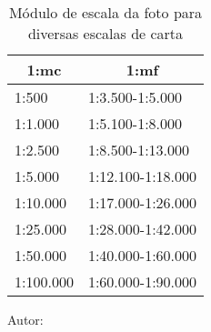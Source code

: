 	\begin{table}[H]
    \centering
		\begin{tabular}{l|l}
			\hline
			\multicolumn{1}{c|}{\textbf{1:mc}} & \multicolumn{1}{c}{\textbf{1:mf}} \\ \hline
			1:500 & 1:3.500-1:5.000 \\ \hline
			1:1.000 & 1:5.100-1:8.000 \\ \hline
			1:2.500 & 1:8.500-1:13.000 \\ \hline
			1:5.000 & 1:12.100-1:18.000 \\ \hline
			1:10.000 & 1:17.000-1:26.000 \\ \hline
			1:25.000 & 1:28.000-1:42.000 \\ \hline
			1:50.000 & 1:40.000-1:60.000 \\ \hline
			1:100.000 & 1:60.000-1:90.000 \\ \hline
		\end{tabular}
		\caption{Módulo de escala da foto para diversas escalas de carta}
    Autor: 
		\label{tb:escalas_fotos}
	\end{table}
	
